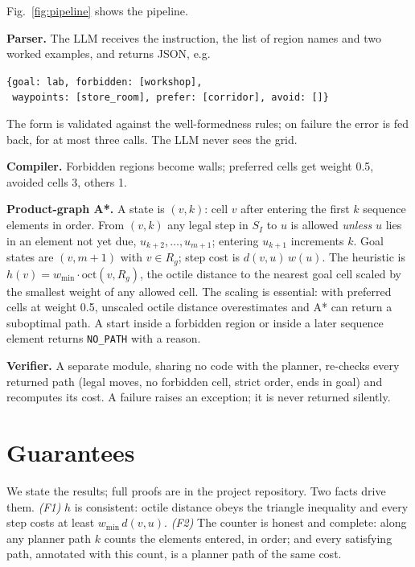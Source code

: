 \documentclass[letterpaper, 10 pt, conference]{ieeeconf}
\newcommand{\nopath}{\texttt{NO\_PATH}}
\begin{document}
Fig.~\ref{fig:pipeline} shows the pipeline.

\textbf{Parser.} The LLM receives the instruction, the list of region names and two
worked examples, and returns JSON, e.g.
\begin{center}
\footnotesize
\texttt{\{goal: lab, forbidden: [workshop],}\\
\texttt{\ waypoints: [store\_room], prefer: [corridor], avoid: []\}}
\end{center}
The form is validated against the well-formedness rules; on failure the error is fed
back, for at most three calls. The LLM never sees the grid.

\textbf{Compiler.} Forbidden regions become walls; preferred cells get weight 0.5,
avoided cells 3, others 1.

\textbf{Product-graph A*.} A state is $(v,k)$: cell $v$ after entering the first $k$
sequence elements in order. From $(v,k)$ any legal step in $S_I$ to $u$ is allowed
\emph{unless} $u$ lies in an element not yet due, $u_{k+2},\dots,u_{m+1}$; entering
$u_{k+1}$ increments $k$. Goal states are $(v,m+1)$ with $v\in R_g$; step cost is
$d(v,u)\,w(u)$. The heuristic is $h(v) = w_{\min}\cdot \mathrm{oct}(v,R_g)$, the octile
distance to the nearest goal cell scaled by the smallest weight of any allowed cell.
The scaling is essential: with preferred cells at weight 0.5, unscaled octile
distance overestimates and A* can return a suboptimal path. A start inside a forbidden
region or inside a later sequence element returns \nopath{} with a reason.

\textbf{Verifier.} A separate module, sharing no code with the planner, re-checks
every returned path (legal moves, no forbidden cell, strict order, ends in goal) and
recomputes its cost. A failure raises an exception; it is never returned silently.

\section{Guarantees}
\label{sec:theory}

We state the results; full proofs are in the project repository. Two facts drive
them. \emph{(F1)} $h$ is consistent: octile distance obeys the triangle inequality and
every step costs at least $w_{\min}\,d(v,u)$. \emph{(F2)} The counter is honest and
complete: along any planner path $k$ counts the elements entered, in order; and every
satisfying path, annotated with this count, is a planner path of the same cost.
\end{document}
